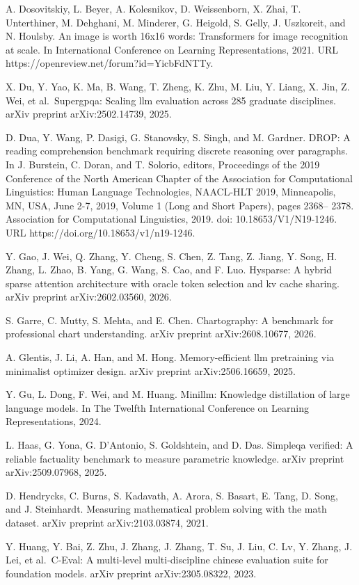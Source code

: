 \documentclass[
  10
]{article}
\begin{document}
A. Dosovitskiy, L. Beyer, A. Kolesnikov, D. Weissenborn, X. Zhai, T.
Unterthiner, M. Dehghani, M. Minderer, G. Heigold, S. Gelly, J.
Uszkoreit, and N. Houlsby. An image is worth 16x16 words: Transformers
for image recognition at scale. In International Conference on Learning
Representations, 2021. URL https://openreview.net/forum?id=YicbFdNTTy.

X. Du, Y. Yao, K. Ma, B. Wang, T. Zheng, K. Zhu, M. Liu, Y. Liang, X.
Jin, Z. Wei, et al.~Supergpqa: Scaling llm evaluation across 285
graduate disciplines. arXiv preprint arXiv:2502.14739, 2025.

D. Dua, Y. Wang, P. Dasigi, G. Stanovsky, S. Singh, and M. Gardner.
DROP: A reading comprehension benchmark requiring discrete reasoning
over paragraphs. In J. Burstein, C. Doran, and T. Solorio, editors,
Proceedings of the 2019 Conference of the North American Chapter of the
Association for Computational Linguistics: Human Language Technologies,
NAACL-HLT 2019, Minneapolis, MN, USA, June 2-7, 2019, Volume 1 (Long and
Short Papers), pages 2368-- 2378. Association for Computational
Linguistics, 2019. doi: 10.18653/V1/N19-1246. URL
https://doi.org/10.18653/v1/n19-1246.

Y. Gao, J. Wei, Q. Zhang, Y. Cheng, S. Chen, Z. Tang, Z. Jiang, Y. Song,
H. Zhang, L. Zhao, B. Yang, G. Wang, S. Cao, and F. Luo. Hysparse: A
hybrid sparse attention architecture with oracle token selection and kv
cache sharing. arXiv preprint arXiv:2602.03560, 2026.

S. Garre, C. Mutty, S. Mehta, and E. Chen. Chartography: A benchmark for
professional chart understanding. arXiv preprint arXiv:2608.10677, 2026.

A. Glentis, J. Li, A. Han, and M. Hong. Memory-efficient llm pretraining
via minimalist optimizer design. arXiv preprint arXiv:2506.16659, 2025.

Y. Gu, L. Dong, F. Wei, and M. Huang. Minillm: Knowledge distillation of
large language models. In The Twelfth International Conference on
Learning Representations, 2024.

L. Haas, G. Yona, G. D'Antonio, S. Goldshtein, and D. Das. Simpleqa
verified: A reliable factuality benchmark to measure parametric
knowledge. arXiv preprint arXiv:2509.07968, 2025.

D. Hendrycks, C. Burns, S. Kadavath, A. Arora, S. Basart, E. Tang, D.
Song, and J. Steinhardt. Measuring mathematical problem solving with the
math dataset. arXiv preprint arXiv:2103.03874, 2021.

Y. Huang, Y. Bai, Z. Zhu, J. Zhang, J. Zhang, T. Su, J. Liu, C. Lv, Y.
Zhang, J. Lei, et al.~C-Eval: A multi-level multi-discipline chinese
evaluation suite for foundation models. arXiv preprint arXiv:2305.08322,
2023.
\end{document}
